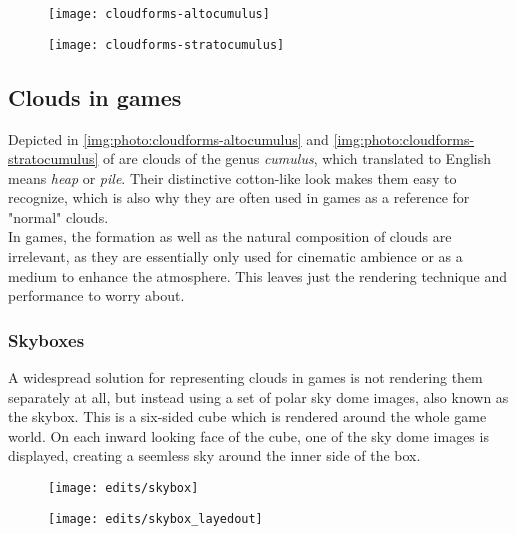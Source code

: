\begin{figure}[ht]
    \centering
        \begin{minipage}{0.47\linewidth}
            \texttt{[image: cloudforms-altocumulus]}
            \label{img:photo:cloudforms-altocumulus}        
        \end{minipage}        
    \hfill
        \begin{minipage}{0.47\linewidth}
            \texttt{[image: cloudforms-stratocumulus]}
            \label{img:photo:cloudforms-stratocumulus}        
        \end{minipage}  
\end{figure}

\subsection{Clouds in games}
\label{section:clouds-in-games}
Depicted in \autoref{img:photo:cloudforms-altocumulus} and \autoref{img:photo:cloudforms-stratocumulus} of  are clouds of the genus \textit{cumulus}, which translated to English means \textit{heap} or \textit{pile}.
Their distinctive cotton-like look makes them easy to recognize, which is also why they are often used in games as a reference for "normal" clouds. 
\\
In games, the formation as well as the natural composition of clouds are irrelevant, as they are essentially only used for cinematic ambience or as a medium to enhance the atmosphere. This leaves just the rendering technique and performance to worry about.

\subsubsection{Skyboxes}
A widespread solution for representing clouds in games is not rendering them separately at all, but instead using a set of polar sky dome images, also known as the skybox. This is a six-sided cube which is rendered around the whole game world. On each inward looking face of the cube, one of the sky dome images is displayed, creating a seemless sky around the inner side of the box.
\begin{figure}[H]
    \centering
        \begin{minipage}{0.47\linewidth}
            \texttt{[image: edits/skybox]}
            \label{img:edits:skybox}
        \end{minipage}
    \hfill
        \begin{minipage}{0.45\linewidth}
            \texttt{[image: edits/skybox\_layedout]}
            \label{img:edits:skybox_layedout}
        \end{minipage}
\end{figure}

